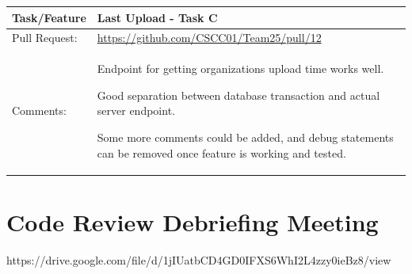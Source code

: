 \documentclass[12pt]{article}
\begin{document}
\begin{table}[H]
\begin{tabular}{|p{3cm}|p{11cm}|}
\hline
Task/Feature  & Last Upload - Task C
 \\ \hline
Pull Request: & \url{https://github.com/CSCC01/Team25/pull/12}                                                                                                                                                                                                                                                                                                                      \\ \hline

Comments:     & Endpoint for getting organizations upload time works well.

Good separation between database transaction and actual server endpoint.

Some more comments could be added, and debug statements can be removed once feature is working and tested.


 \\ \hline
\end{tabular}
\end{table}

\section{Code Review Debriefing Meeting}

https://drive.google.com/file/d/1jIUatbCD4GD0IFXS6WhI2L4zzy0ieBz8/view

\newpage


\end{document}
